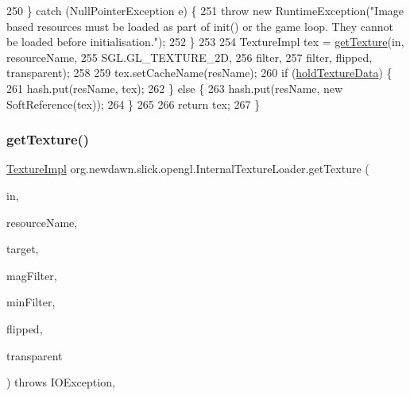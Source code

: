 \begin{DoxyCode}
250         \} \textcolor{keywordflow}{catch} (NullPointerException e) \{
251             \textcolor{keywordflow}{throw} \textcolor{keyword}{new} RuntimeException(\textcolor{stringliteral}{"Image based resources must be loaded as part of init() or the game
       loop. They cannot be loaded before initialisation."});
252         \}
253         
254         TextureImpl tex = \mbox{\hyperlink{classorg_1_1newdawn_1_1slick_1_1opengl_1_1_internal_texture_loader_a5d76355a0aa7c2b3d7dd6106412d5805}{getTexture}}(in, resourceName,
255                          SGL.GL\_TEXTURE\_2D, 
256                          filter, 
257                          filter, flipped, transparent);
258         
259         tex.setCacheName(resName);
260         \textcolor{keywordflow}{if} (\mbox{\hyperlink{classorg_1_1newdawn_1_1slick_1_1opengl_1_1_internal_texture_loader_a45b8c17af18ad5095972b3f519eb17bd}{holdTextureData}}) \{
261             hash.put(resName, tex);
262         \} \textcolor{keywordflow}{else} \{
263             hash.put(resName, \textcolor{keyword}{new} SoftReference(tex));
264         \}
265         
266         \textcolor{keywordflow}{return} tex;
267     \}
\end{DoxyCode}
\mbox{\label{classorg_1_1newdawn_1_1slick_1_1opengl_1_1_internal_texture_loader_a3b0ac135ea1ae7f431458f15ca702d56}} 
\subsubsection{\texorpdfstring{get\+Texture()}{getTexture()}\hspace{0.1cm}{\footnotesize\ttfamily [7/8]}}
{\footnotesize\ttfamily \mbox{\hyperlink{classorg_1_1newdawn_1_1slick_1_1opengl_1_1_texture_impl}{Texture\+Impl}} org.\+newdawn.\+slick.\+opengl.\+Internal\+Texture\+Loader.\+get\+Texture (\begin{DoxyParamCaption}\item[{Input\+Stream}]{in,  }\item[{String}]{resource\+Name,  }\item[{int}]{target,  }\item[{int}]{mag\+Filter,  }\item[{int}]{min\+Filter,  }\item[{boolean}]{flipped,  }\item[{int \mbox{[}$\,$\mbox{]}}]{transparent }\end{DoxyParamCaption}) throws I\+O\+Exception\hspace{0.3cm}{\ttfamily [inline]}, {\ttfamily [private]}}

